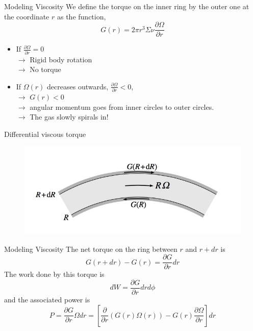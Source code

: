 \documentclass{beamer}
\begin{document}
\begin{frame}{Modeling Viscosity}
	We define the torque on the inner ring by the outer one at the coordinate $r$ as the function, 
	\pause
	\[G(r) = 2 \pi r^3 \Sigma \nu \frac{\partial \Omega}{\partial r}\]
	\begin{itemize}
	\item If $\frac{\partial \Omega}{\partial r}=0$\\ 
	\pause
	$\rightarrow$ Rigid body rotation\\
	\pause
	$\rightarrow$ No torque
	\pause
	
	\item If $\Omega (r)$ decreases outwards, $\frac{\partial \Omega}{\partial r}<0$,\\
	\pause
	$\rightarrow$ $G(r)<0$\\
	\pause
	$\rightarrow$ angular momentum goes from inner circles to outer circles.\\
	\pause
	$\rightarrow$ The gas slowly spirals in!
	\end{itemize}
\end{frame}

\begin{frame}{Differential viscous torque}
	\begin{center}
      \begin{figure}
      	\includegraphics[scale=0.4] {figures/differentialRotation2.jpeg}
      \end{figure}
	\end{center}	
\end{frame}

\begin{frame}{Modeling Viscosity}
	The net torque on the ring between $r$ and $r+dr$ is
	\[ G(r+dr)-G(r) = \frac{\partial G}{\partial r} dr\] 
	\pause
	The work done by this torque is	
	\pause
	\[dW = \frac{\partial G}{\partial r} dr d\phi \]
	\pause
	and the associated power is
	\[P = \frac{\partial G}{\partial r} \Omega dr = \left[ \frac{\partial}{\partial r}  \left( G(r) \Omega (r) \right) - G(r) \frac{\partial \Omega}{\partial r}  \right] dr  \]
\end{frame}
\end{document}
